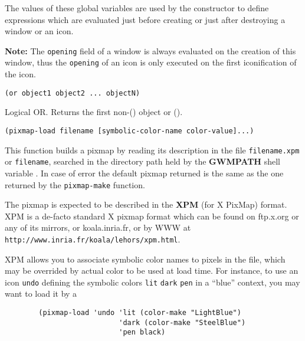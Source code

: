 

The values of these global variables are used by the 
constructor to define {\WOOL} expressions which are evaluated just before
creating or just after destroying a window or an icon. 

{\bf Note:} The \verb"opening" field of a window is always evaluated on the
creation of this window, thus the \verb"opening" of an icon is only
executed on the first iconification of the icon.

        
{\usagefont\begin{verbatim}
(or object1 object2 ... objectN)
\end{verbatim}}\usageupspace

Logical OR\@. Returns the first non-() object or ().

        
{\usagefont\begin{verbatim}
(pixmap-load filename [symbolic-color-name color-value]...)
\end{verbatim}}\usageupspace

This function builds a pixmap by reading its description in the file
\verb"filename.xpm" or \verb"filename", searched in the directory path held
by the {\bf GWMPATH} shell variable . 
In case of
error the default pixmap returned is the same as the one returned by the
\verb"pixmap-make" function.

The pixmap is expected to be described in the {\bf XPM} (for X PixMap)
format. XPM is a de-facto standard X pixmap format which can be found on
ftp.x.org or any of its mirrors, or koala.inria.fr, or by WWW at 
{\tt http://www.inria.fr/koala/lehors/xpm.html}.

XPM allows you to associate symbolic color names to pixels in the file, which
may be overrided by actual color to be used at load time. For instance, to use
an icon \verb|undo| defining the symbolic colors \verb|lit| \verb|dark|
\verb|pen| in a ``blue'' context, you may want to load it by a

{\exemplefont\begin{verbatim}
        (pixmap-load 'undo 'lit (color-make "LightBlue")
                           'dark (color-make "SteelBlue")
                           'pen black)
\end{verbatim}}

